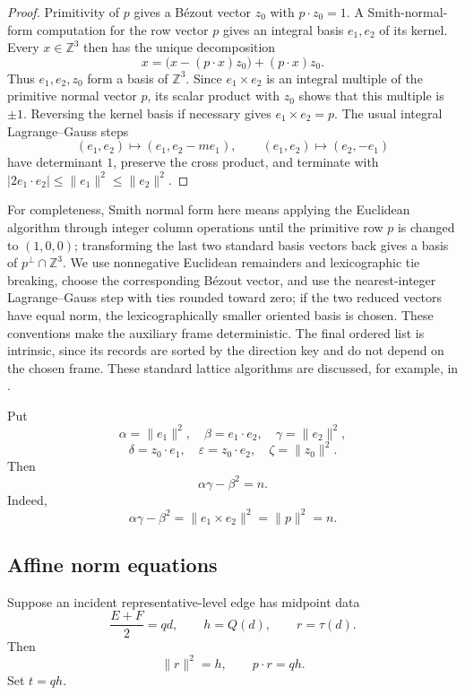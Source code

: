\documentclass[11pt]{amsart}
\theoremstyle{definition}
\theoremstyle{remark}
\newcommand{\Z}{\mathbb Z}
\begin{document}
\begin{proof}
Primitivity of $p$ gives a B\'ezout vector $z_0$ with $p\cdot z_0=1$.  A
Smith-normal-form computation for the row vector $p$ gives an integral basis
$e_1,e_2$ of its kernel.  Every $x\in\Z^3$ then has the unique decomposition
\[
 x=\bigl(x-(p\cdot x)z_0\bigr)+(p\cdot x)z_0.
\]
Thus $e_1,e_2,z_0$ form a basis of $\Z^3$.  Since $e_1\times e_2$ is an
integral multiple of the primitive normal vector $p$, its scalar product with
$z_0$
shows that this multiple is $\pm1$.  Reversing the kernel basis if necessary
gives $e_1\times e_2=p$.  The usual integral Lagrange--Gauss steps
\[
 (e_1,e_2)\mapsto(e_1,e_2-me_1),
 \qquad
 (e_1,e_2)\mapsto(e_2,-e_1)
\]
have determinant $1$, preserve the cross product, and terminate with
$|2e_1\cdot e_2|\le\|e_1\|^2\le\|e_2\|^2$.
\end{proof}

For completeness, Smith normal form here means applying the Euclidean
algorithm through integer column operations until the primitive row $p$ is
changed to $(1,0,0)$; transforming the last two standard basis vectors back
gives a basis of $p^\perp\cap\Z^3$.  We use nonnegative Euclidean remainders
and lexicographic tie breaking, choose the corresponding B\'ezout vector, and
use the nearest-integer Lagrange--Gauss step with ties rounded toward zero;
if the two reduced vectors have equal norm, the lexicographically smaller
oriented basis is chosen.  These conventions make the auxiliary frame
deterministic.  The final ordered list is intrinsic, since its records are
sorted by the direction key and do not depend on the chosen frame.  These
standard lattice algorithms are discussed, for example, in
\cite[Chap.~2]{Cohen}.

Put
\[
 \alpha=\|e_1\|^2,
 \quad
 \beta=e_1\cdot e_2,
 \quad
 \gamma=\|e_2\|^2,
\]
\[
 \delta=z_0\cdot e_1,
 \quad
 \varepsilon=z_0\cdot e_2,
 \quad
 \zeta=\|z_0\|^2.
\]
Then
\begin{equation}\label{eq:gram-det}
 \alpha\gamma-\beta^2=n.
\end{equation}
Indeed,
\[
 \alpha\gamma-\beta^2
 =\|e_1\times e_2\|^2
 =\|p\|^2=n.
\]

\subsection{Affine norm equations}

Suppose an incident representative-level edge has midpoint data
\[
 \frac{E+F}{2}=qd,
 \qquad
 h=Q(d),
 \qquad
 r=\tau(d).
\]
Then
\begin{equation}\label{eq:Pr}
 \|r\|^2=h,
 \qquad
 p\cdot r=qh.
\end{equation}
Set $t=qh$.
\end{document}
